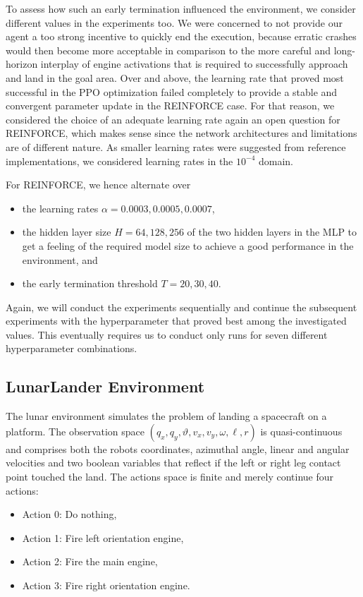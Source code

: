 \documentclass[a4paper, 11pt]{article}
\begin{document}
	To assess how such an early termination influenced the environment, we consider different values in the experiments too. We were concerned to not provide our agent a too strong incentive to quickly end the execution, because erratic crashes would then become more acceptable in comparison to the more careful and long-horizon interplay of engine activations that is required to successfully approach and land in the goal area.
	Over and above, the learning rate that proved most successful in the PPO optimization failed completely to provide a stable and convergent parameter update in the REINFORCE case. For that reason, we considered the choice of an adequate learning rate again an open question for REINFORCE, which makes sense since the network architectures and limitations are of different nature.
	As smaller learning rates were suggested from reference implementations, we considered learning rates in the $10^{-4}$ domain.
	
	For REINFORCE, we hence alternate over
	\begin{itemize}
		\item the learning rates $\alpha=0.0003,0.0005,0.0007$,
		\item the hidden layer size $H=64,128,256$ of the two hidden layers in the MLP to get a feeling of the required model size to achieve a good performance in the environment, and
		\item the early termination threshold $T=20,30,40$.
	\end{itemize}
	Again, we will conduct the experiments sequentially and continue the subsequent experiments with the hyperparameter that proved best among the investigated values. This eventually requires us to conduct only runs for seven different hyperparameter combinations.
	\subsection{LunarLander Environment}
	The lunar environment simulates the problem of landing a spacecraft on a platform. The observation space $(q_x,q_y,\vartheta,v_x,v_y,\omega,\ell,r)$ is quasi-continuous and comprises both the robots coordinates, azimuthal angle, linear and angular velocities and two boolean variables that reflect if the left or right leg contact point touched the land.
	The actions space is finite and merely continue four actions:
	\begin{itemize}
		\item Action 0: Do nothing,
		\item Action 1: Fire left orientation engine,
		\item Action 2: Fire the main engine,
		\item Action 3: Fire right orientation engine.
	\end{itemize}
	
\end{document}
